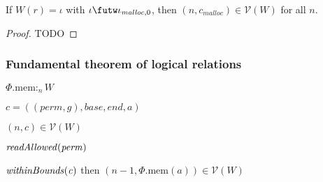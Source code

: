 \documentclass[a4paper]{article}
\newcommand{\var}[1]{\mathit{#1}}
\newcommand{\gl}{\var{g}}
\newcommand{\addr}{\var{a}}
\newcommand{\start}{\var{base}}
\newcommand{\addrend}{\var{end}}
\newcommand{\heap}{\var{mem}}
\newcommand{\perm}{\var{perm}}
\newcommand{\plainproj}[1]{\mathrm{#1}}
\newcommand{\memheap}[1][\Phi]{#1.\plainproj{mem}}
\newcommand{\plainfun}[2]{
  \ifthenelse{\equal{#2}{}}
  {\mathit{#1}}
  {\mathit{#1}(#2)}
}
\newcommand{\readAllowed}[1]{\plainfun{readAllowed}{#1}}
\newcommand{\withinBounds}[1]{\plainfun{withinBounds}{#1}}
\newcommand{\heapSat}[3][\heap]{#1 :_{#2} #3}
\newcommand{\codelabel}[1]{\mathit{#1}}
\newcommand{\malloc}{\codelabel{malloc}}
\newcommand{\asmType}{\plaindom{AsmType}}
\newcommand{\plaindom}[1]{\mathrm{#1}}
\newcommand{\intr}[2]{\mathcal{#1}}
\newcommand{\valueintr}[1]{\intr{V}{#1}}
\newcommand{\stdvr}{\valueintr{\asmType}}
\newcommand{\npair}[2][n]{\left(#1,#2 \right)}
\begin{document}
\begin{lemma}
  If $W(r) = \iota$ with $\iota \futw \iota_{\malloc,0}$, then
  $\npair{c_\malloc} \in \stdvr(W)$ for all $n$.
\end{lemma}
\begin{proof}
  TODO
\end{proof}

\subsubsection{Fundamental theorem of logical relations}

\begin{lemma}
  \label{lem:conds-load-suffice}
  \item $\heapSat[\memheap]{n}{W}$
  \item $\var{c} = ((\perm,\gl),\start,\addrend,\addr)$
  \item $\npair{c}\in\stdvr(W)$
  \item $\readAllowed{\perm}$ 
  \item $\withinBounds{\var{c}}$
  then $\npair[n-1]{\memheap(\addr)} \in \stdvr(W)$
\end{lemma}
\end{document}
